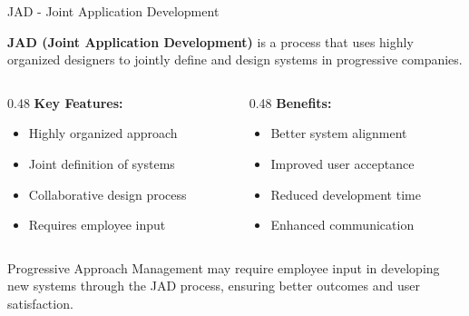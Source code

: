 \documentclass[aspectratio=169]{beamer}
\begin{document}
\begin{frame}{JAD - Joint Application Development}
    \begin{definition}
        \textbf{JAD (Joint Application Development)} is a process that uses highly organized designers to jointly define and design systems in progressive companies.
    \end{definition}
    
    \vspace{0.5cm}
    \begin{columns}
        \begin{column}{0.48\textwidth}
            \textbf{Key Features:}
            \begin{itemize}
                \item Highly organized approach
                \item Joint definition of systems
                \item Collaborative design process
                \item Requires employee input
            \end{itemize}
        \end{column}
        \begin{column}{0.48\textwidth}
            \textbf{Benefits:}
            \begin{itemize}
                \item Better system alignment
                \item Improved user acceptance
                \item Reduced development time
                \item Enhanced communication
            \end{itemize}
        \end{column}
    \end{columns}
    
    \vspace{0.5cm}
    \begin{exampleblock}{Progressive Approach}
        Management may require employee input in developing new systems through the JAD process, ensuring better outcomes and user satisfaction.
    \end{exampleblock}
\end{frame}
\end{document}
